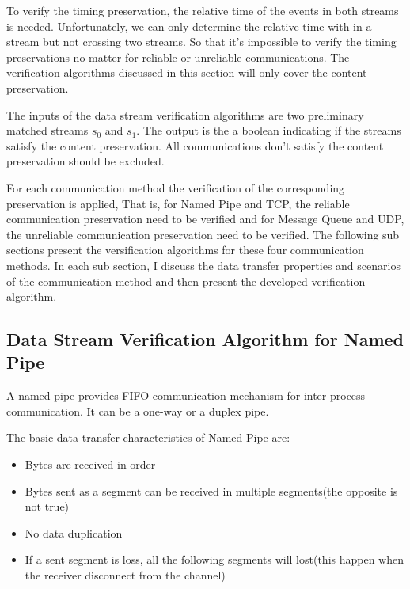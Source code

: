 To verify the timing preservation, the relative time of the events in both streams is needed. Unfortunately, we can only determine the relative time with in a stream but not crossing two streams. So that it's impossible to verify the timing preservations no matter for reliable or unreliable communications. The verification algorithms discussed in this section will only cover the content preservation.  

The inputs of the data stream verification algorithms are two preliminary matched streams $s_0$ and $s_1$. The output is the a boolean indicating if the streams satisfy the content preservation. All communications don't satisfy the content preservation should be excluded.

For each communication method the verification of the corresponding preservation is applied, That is, for Named Pipe and TCP, the reliable communication preservation need to be verified and for Message Queue and UDP, the unreliable communication preservation need to be verified. The following sub sections present the versification  algorithms for these four communication methods. In each sub section, I discuss the data transfer properties and scenarios of the communication method and then present the developed verification algorithm.

\subsection{Data Stream Verification Algorithm for Named Pipe}
A named pipe provides FIFO communication mechanism for inter-process communication. It can be a one-way or a duplex pipe. \cite{khambattinamed}

The basic data transfer characteristics of Named Pipe are:
\begin{itemize}
  \item Bytes are received in order
  \item Bytes sent as a segment can be received in multiple segments(the opposite is not true)
  \item No data duplication
  \item If a sent segment is loss, all the following segments will lost(this happen when the receiver disconnect from the channel) 
  
\end{itemize}

